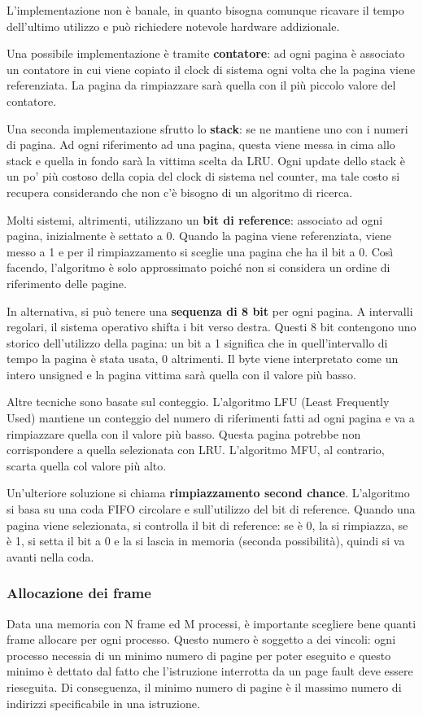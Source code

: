 \documentclass[a4paper]{article}
\begin{document}
L'implementazione non è banale, in quanto bisogna comunque ricavare il tempo dell'ultimo utilizzo e può richiedere notevole hardware addizionale.

Una possibile implementazione è tramite \textbf{contatore}: ad ogni pagina è associato un contatore in cui viene copiato il clock di sistema ogni volta che la pagina viene referenziata. La pagina da rimpiazzare sarà quella con il più piccolo valore del contatore.

Una seconda implementazione sfrutto lo \textbf{stack}: se ne mantiene uno con i numeri di pagina. Ad ogni riferimento ad una pagina, questa viene messa in cima allo stack e quella in fondo sarà la vittima scelta da LRU. Ogni update dello stack è un po' più costoso della copia del clock di sistema nel counter, ma tale costo si recupera considerando che non c'è bisogno di un algoritmo di ricerca.

Molti sistemi, altrimenti, utilizzano un \textbf{bit di reference}: associato ad ogni pagina, inizialmente è settato a 0. Quando la pagina viene referenziata, viene messo a 1 e per il rimpiazzamento si sceglie una pagina che ha il bit a 0. Così facendo, l'algoritmo è solo approssimato poiché non si considera un ordine di riferimento delle pagine.

In alternativa, si può tenere una \textbf{sequenza di 8 bit} per ogni pagina. A intervalli regolari, il sistema operativo shifta i bit verso destra. Questi 8 bit contengono uno storico dell'utilizzo della pagina: un bit a 1 significa che in quell'intervallo di tempo la pagina è stata usata, 0 altrimenti. Il byte viene interpretato come un intero unsigned e la pagina vittima sarà quella con il valore più basso.

Altre tecniche sono basate sul conteggio. L'algoritmo LFU (Least Frequently Used) mantiene un conteggio del numero di riferimenti fatti ad ogni pagina e va a rimpiazzare quella con il valore più basso. Questa pagina potrebbe non corrispondere a quella selezionata con LRU. L'algoritmo MFU, al contrario, scarta quella col valore più alto.

Un'ulteriore soluzione si chiama \textbf{rimpiazzamento second chance}. L'algoritmo si basa su una coda FIFO circolare e sull'utilizzo del bit di reference. Quando una pagina viene selezionata, si controlla il bit di reference: se è 0, la si rimpiazza, se è 1, si setta il bit a 0 e la si lascia in memoria (seconda possibilità), quindi si va avanti nella coda.

\subsubsection{Allocazione dei frame}
Data una memoria con N frame ed M processi, è importante scegliere bene quanti frame allocare per ogni processo. Questo numero è soggetto a dei vincoli: ogni processo necessia di un minimo numero di pagine per poter eseguito e questo minimo è dettato dal fatto che l'istruzione interrotta da un page fault deve essere rieseguita. Di conseguenza, il minimo numero di pagine è il massimo numero di indirizzi specificabile in una istruzione.
\end{document}
